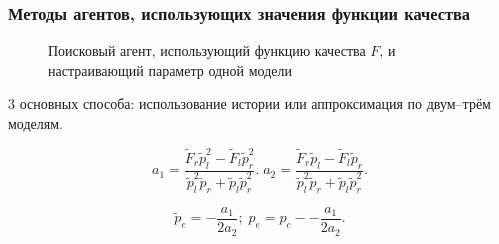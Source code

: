 \documentclass[10pt,utf8]{beamer}
\begin{document}
\begin{frame}
  \frametitle{Методы агентов, использующих значения функции качества}

  \begin{figure}[htb!]
    \begin{center}
      
    \end{center}
    \caption{Поисковый агент, использующий функцию качества $F$, и настраивающий параметр одной модели}
    \label{atu:f:agent1}
  \end{figure}

  \vspace{-4ex}
  3 основных способа: использование истории или аппроксимация по двум--трём моделям.

  \[
    a_1 = \frac{\tilde{F}_r \tilde{p}_l^2 - \tilde{F}_l \tilde{p}_r^2 }
             { \tilde{p}_l^2 \tilde{p}_r  + \tilde{p}_l \tilde{p}_r^2 }.
    \;
  a_2 = \frac{\tilde{F}_r \tilde{p}_l - \tilde{F}_l \tilde{p}_r }
             { \tilde{p}_l^2 \tilde{p}_r  + \tilde{p}_l \tilde{p}_r^2 }.
  \]

\begin{equation}
  \tilde{p}_e = - \frac{a_1}{2 a_2};
  \;
  p_e = p_c -- \frac{a_1}{2 a_2}.
  \label{atu:eq:p_F_e}
\end{equation}

\end{frame}




\end{document}
